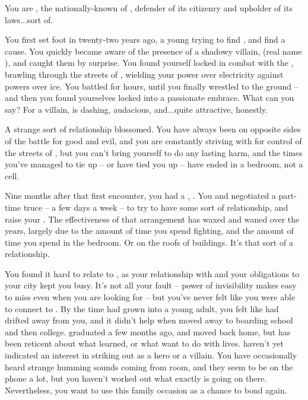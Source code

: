 \documentclass[char]{LRSguildcamp1}
\begin{document}
\name{\cOS{}}
You are \cOS{\intro}, the nationally-known \cOS{\hero} of \pCityO{}, defender of its citizenry and upholder of its laws...sort of.

You first set foot in \pCityO{} twenty-two years ago, a young \cOS{\hero} trying to find \cOS{\themself}, and find a cause.  You quickly became aware of the presence of a shadowy villain, \cOldest{\MYsupername} (real name \cOldest{\intro}), and caught them by surprise.  %
You found yourself locked in combat with the \cOldest{\villain}, brawling through the streets of \pCityO{}, wielding your power over electricity against \cOldest{\their} powers over ice.  You battled for hours, until you finally wrestled \cOldest{\them} to the ground -- and then you found yourselves locked into a passionate embrace.  What can you say?  For a villain, \cOldest{} is dashing, audacious, and...quite attractive, honestly.

A strange sort of relationship blossomed.  You have always been on opposite sides of the battle for good and evil, and you are constantly striving with \cOS{\them} for control of the streets of \pCityO{}, but you can't bring yourself to do \cOS{\them} any lasting harm, and the times you've managed to tie \cOS{\them} up -- or \cOS{\they} have tied you up -- have ended in a bedroom, not a cell.

Nine months after that first encounter, you had a \cGrad{\offspring}, \cGrad{\intro}.  
You and \cOldest{} negotiated a part-time truce -- a few days a week -- to try to have some sort of relationship, and raise your \cGrad{\offspring}.  
The effectiveness of that arrangement has waxed and waned over the years, largely due to the amount of time you spend fighting, and the amount of time you spend in the bedroom.
Or on the roofs of buildings.  
It's that sort of a relationship.  

You found it hard to relate to \cGrad{}, as your relationship with \cOldest{} and your obligations to your city kept you busy.
It's not all your fault -- \cGrad{\their} power of invisibility makes \cGrad{\them} easy to miss even when you are looking for \cGrad{\them} -- but you've never felt like you were able to connect to \cGrad{\them}.  
By the time \cGrad{\they} had grown into a young adult, you felt like \cGrad{} had drifted away from you, and it didn't help when \cGrad{\they} moved away to boarding school and then college.
\cGrad{\They} graduated a few months ago, and moved back home, but has been reticent about what \cGrad{\they} learned, or what \cGrad{\they} want to do with \cGrad{\their} lives.  \cGrad{\They} haven't yet indicated an interest in striking out as a hero or a villain.  
You have occasionally heard strange humming sounds coming from \cGrad{\their} room, and they seem to be on the phone a lot, but you haven't worked out what exactly is going on there. %
Nevertheless, you want to use this family occasion as a chance to bond again.
\end{document}
